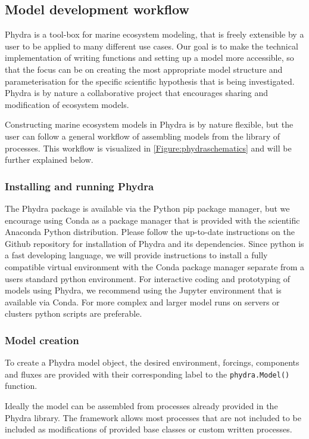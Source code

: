 \documentclass[template.tex]{subfiles}
\begin{document}
\subsection{Model development workflow}

Phydra is a tool-box for marine ecosystem modeling, that is freely extensible by a user to be applied to many different use cases. Our goal is to make the technical implementation of writing functions and setting up a model more accessible, so that the focus can be on creating the most appropriate model structure and parameterisation for the specific scientific hypothesis that is being investigated. 
Phydra is by nature a collaborative project that encourages sharing and modification of ecosystem models.

Constructing marine ecosystem models in Phydra is by nature flexible, but the user can follow a general workflow of assembling models from the library of processes. This workflow is visualized in \ref{Figure:phydraschematics} and will be further explained below.

\subsubsection{Installing and running Phydra}
The Phydra package is available via the Python pip package manager, but we encourage using Conda as a package manager that is provided with the scientific Anaconda Python distribution.
Please follow the up-to-date instructions on the Github repository for installation of Phydra and its dependencies.
Since python is a fast developing language, we will provide instructions to install a fully compatible virtual environment with the Conda package manager separate from a users standard python environment. For interactive coding and prototyping of models using Phydra, we recommend using the Jupyter environment that is available via Conda. For more complex and larger model runs on servers or clusters python scripts are preferable.


\subsubsection{Model creation}

To create a Phydra model object, the desired environment, forcings, components and fluxes are provided with their corresponding label to the \texttt{phydra.Model()} function.

Ideally the model can be assembled from processes already provided in the Phydra library. The framework allows most processes that are not included to be included as modifications of provided base classes or custom written processes. 
\end{document}
